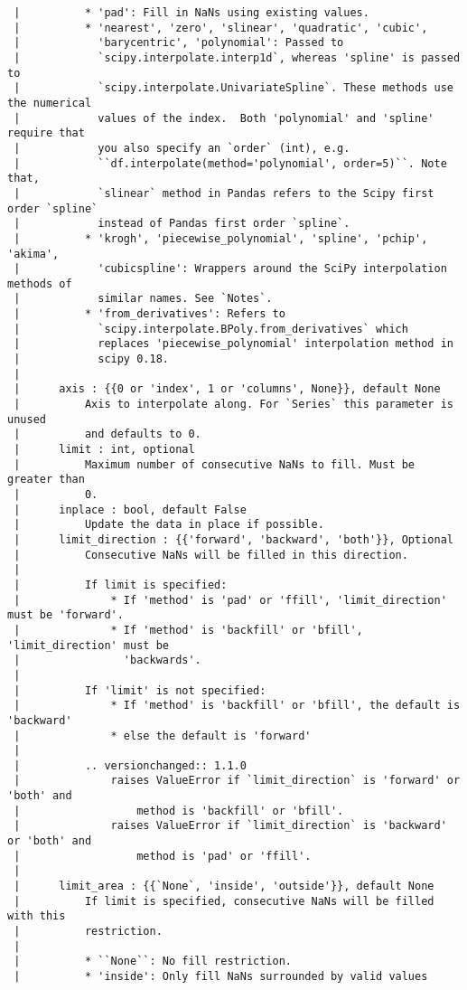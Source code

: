 \documentclass[
  letterpaper,
  DIV=11,
  numbers=noendperiod]{scrreprt}
\begin{document}
\begin{verbatim}
 |          * 'pad': Fill in NaNs using existing values.
 |          * 'nearest', 'zero', 'slinear', 'quadratic', 'cubic',
 |            'barycentric', 'polynomial': Passed to
 |            `scipy.interpolate.interp1d`, whereas 'spline' is passed to
 |            `scipy.interpolate.UnivariateSpline`. These methods use the numerical
 |            values of the index.  Both 'polynomial' and 'spline' require that
 |            you also specify an `order` (int), e.g.
 |            ``df.interpolate(method='polynomial', order=5)``. Note that,
 |            `slinear` method in Pandas refers to the Scipy first order `spline`
 |            instead of Pandas first order `spline`.
 |          * 'krogh', 'piecewise_polynomial', 'spline', 'pchip', 'akima',
 |            'cubicspline': Wrappers around the SciPy interpolation methods of
 |            similar names. See `Notes`.
 |          * 'from_derivatives': Refers to
 |            `scipy.interpolate.BPoly.from_derivatives` which
 |            replaces 'piecewise_polynomial' interpolation method in
 |            scipy 0.18.
 |      
 |      axis : {{0 or 'index', 1 or 'columns', None}}, default None
 |          Axis to interpolate along. For `Series` this parameter is unused
 |          and defaults to 0.
 |      limit : int, optional
 |          Maximum number of consecutive NaNs to fill. Must be greater than
 |          0.
 |      inplace : bool, default False
 |          Update the data in place if possible.
 |      limit_direction : {{'forward', 'backward', 'both'}}, Optional
 |          Consecutive NaNs will be filled in this direction.
 |      
 |          If limit is specified:
 |              * If 'method' is 'pad' or 'ffill', 'limit_direction' must be 'forward'.
 |              * If 'method' is 'backfill' or 'bfill', 'limit_direction' must be
 |                'backwards'.
 |      
 |          If 'limit' is not specified:
 |              * If 'method' is 'backfill' or 'bfill', the default is 'backward'
 |              * else the default is 'forward'
 |      
 |          .. versionchanged:: 1.1.0
 |              raises ValueError if `limit_direction` is 'forward' or 'both' and
 |                  method is 'backfill' or 'bfill'.
 |              raises ValueError if `limit_direction` is 'backward' or 'both' and
 |                  method is 'pad' or 'ffill'.
 |      
 |      limit_area : {{`None`, 'inside', 'outside'}}, default None
 |          If limit is specified, consecutive NaNs will be filled with this
 |          restriction.
 |      
 |          * ``None``: No fill restriction.
 |          * 'inside': Only fill NaNs surrounded by valid values

\end{verbatim}
\end{document}
